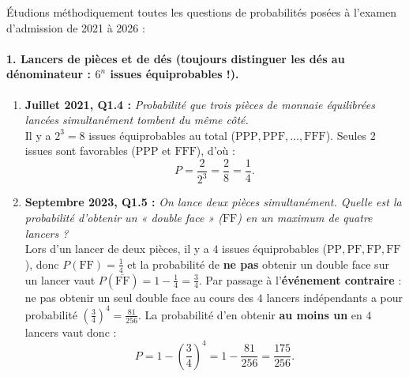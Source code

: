 \begin{exemple}
Étudions méthodiquement toutes les questions de probabilités posées à l'examen d'admission de 2021 à 2026 :

\paragraph{1. Lancers de pièces et de dés (toujours distinguer les dés au dénominateur : $6^n$ issues équiprobables !).}
\begin{enumerate}
    \item \textbf{Juillet 2021, Q1.4 :} \emph{Probabilité que trois pièces de monnaie équilibrées lancées simultanément tombent du même côté.}\\
    Il y a $2^3 = 8$ issues équiprobables au total ($\text{PPP}, \text{PPF}, \dots, \text{FFF}$). Seules $2$ issues sont favorables ($\text{PPP}$ et $\text{FFF}$), d'où :
    \[
        P = \frac{2}{2^3} = \frac{2}{8} = \boxed{\frac{1}{4}}.
    \]

    \item \textbf{Septembre 2023, Q1.5 :} \emph{On lance deux pièces simultanément. Quelle est la probabilité d'obtenir un « double face » ($\text{FF}$) en un maximum de quatre lancers ?}\\
    Lors d'un lancer de deux pièces, il y a $4$ issues équiprobables ($\text{PP}, \text{PF}, \text{FP}, \text{FF}$), donc $P(\text{FF}) = \frac{1}{4}$ et la probabilité de \textbf{ne pas} obtenir un double face sur un lancer vaut $P(\overline{\text{FF}}) = 1 - \frac{1}{4} = \frac{3}{4}$.
    Par passage à l'\textbf{événement contraire} : ne pas obtenir un seul double face au cours des $4$ lancers indépendants a pour probabilité $\left(\frac{3}{4}\right)^4 = \frac{81}{256}$. La probabilité d'en obtenir \textbf{au moins un} en $4$ lancers vaut donc :
    \[
        P = 1 - \left(\frac{3}{4}\right)^4 = 1 - \frac{81}{256} = \boxed{\frac{175}{256}}.
    \]


\end{enumerate}
\end{exemple}
